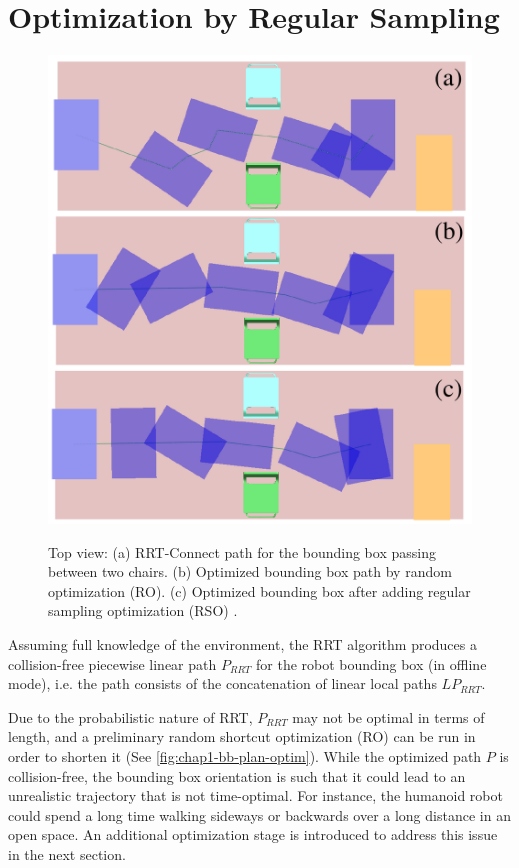 \section{Optimization by Regular Sampling}
\label{sec:chap1-regular-sampling-optim}

\begin{figure}
  \centering
      {\includegraphics[width = 0.8\linewidth]
        {src/chap1-path-optimization/bb-plan-optim.pdf}}
      \caption{Top view: (a) RRT-Connect path for the bounding box
        passing between two chairs. (b) Optimized bounding box path by
        random optimization (RO). (c) Optimized bounding box after
        adding regular sampling optimization (RSO) .}
      \label{fig:chap1-bb-plan-optim}
\end{figure}

Assuming full knowledge of the environment, the RRT
algorithm produces a collision-free piecewise linear path $P_{RRT}$
for the robot bounding box (in offline mode), i.e. the path consists
of the concatenation of linear local paths $LP_{RRT}$.

Due to the probabilistic nature of RRT, $P_{RRT}$ may not be optimal
in terms of length, and a preliminary random shortcut optimization
(RO) can be run in order to shorten it (See
\autoref{fig:chap1-bb-plan-optim}). While the optimized path $P$ is
collision-free, the bounding box orientation is such that it could
lead to an unrealistic trajectory that is not time-optimal. For
instance, the humanoid robot could spend a long time walking sideways
or backwards over a long distance in an open space. An additional
optimization stage is introduced to address this issue in the next
section.

